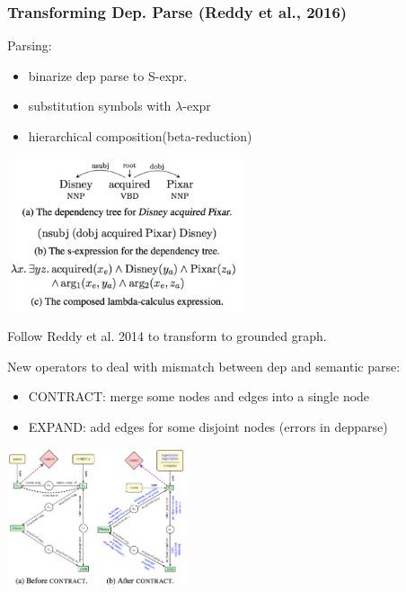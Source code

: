 \documentclass{beamer}
\begin{document}
\begin{frame}
    \frametitle{Transforming Dep. Parse (Reddy et al., 2016)}
    Parsing:
     {
        \begin{itemize}
            \item binarize dep parse to S-expr.
            \item substitution symbols with $\lambda$-expr
            \item hierarchical composition(beta-reduction)
        \end{itemize}

        \begin{center}
            \includegraphics[width=7cm,height=4.5cm]{img/reddy-parse-dep.png}
        \end{center}
    }

     {
        Follow Reddy et al. 2014 to transform to grounded graph.

        New operators to deal with mismatch between dep and semantic parse:
        \begin{itemize}
            \item CONTRACT: merge some nodes and edges into a single node
            \item EXPAND: add edges for some disjoint nodes (errors in depparse)
        \end{itemize}

        \begin{center}
            \includegraphics[width=5.3cm,height=4cm]{img/contract-op.png}
        \end{center}
    }
\end{frame}
\end{document}
